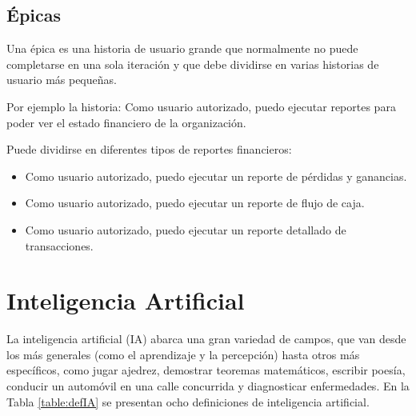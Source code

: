 \subsection{Épicas}
Una épica es una historia de usuario grande que normalmente no puede completarse en una sola iteración y que debe dividirse en varias historias de usuario más pequeñas.\cite{cohan_epic}

Por ejemplo la historia: Como usuario autorizado, puedo ejecutar reportes para poder ver el estado financiero de la organización.

Puede dividirse en diferentes tipos de reportes financieros:
\begin{itemize}
  \item Como usuario autorizado, puedo ejecutar un reporte de pérdidas y ganancias.
  \item Como usuario autorizado, puedo ejecutar un reporte de flujo de caja.
  \item Como usuario autorizado, puedo ejecutar un reporte detallado de transacciones.
\end{itemize}

\section{Inteligencia Artificial}
La inteligencia artificial (IA) abarca una gran variedad de campos, que van desde los más generales (como el aprendizaje y la percepción) hasta otros más específicos, como jugar ajedrez, demostrar teoremas matemáticos, escribir poesía, conducir un automóvil en una calle concurrida y diagnosticar enfermedades. \cite{IABook} En la Tabla \ref{table:defIA} se presentan ocho definiciones de inteligencia artificial.

